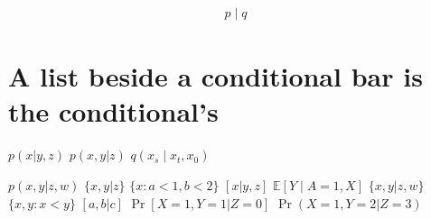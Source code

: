 \documentclass{article}
\begin{document}
\begin{equation}\begin{gathered}p\mid q\end{gathered}\end{equation}

\section{A list beside a conditional bar is the conditional's}
$p(x|y,z)$ $p(x,y|z)$ $q(x_s\mid x_t,x_0)$

$p(x,y|z,w)$ $\{x,y|z\}$ $\{x : a<1, b<2\}$ $[x|y,z]$ $\mathbb{E}[Y\mid A=1,X]$
$\{x,y|z,w\}$ $\{x,y : x<y\}$ $[a,b|c]$ $\Pr[X=1,Y=1|Z=0]$ $\Pr(X=1,Y=2|Z=3)$
\end{document}
